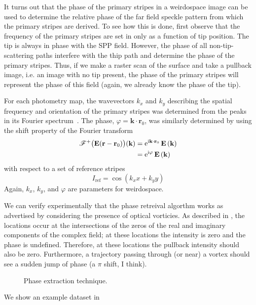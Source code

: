 It turns out that the phase of the primary stripes in a weirdospace image
can be used to determine the relative phase of the far field speckle
pattern from which the primary stripes are derived.  To see how this is
done, first observe that the frequency of the primary stripes are set in
 only as a function of tip position.  The tip
is always in phase with the SPP field.  However, the phase of all
non-tip-scattering paths interfere with the thip path and determine the
phase of the primary stripes.  Thus, if we make a raster scan of the
surface and take a pullback image, i.e. an image with no tip present, the
phase of the primary stripes will represent the phase of this field (again,
we already know the phase of the tip).

For each photometry map, the wavevectors $k_x$ and $k_y$ describing the
spatial frequency and orientation of the primary stripes was determined
from the peaks in its Fourier spectrum~\cite{huntley1986speckle}.  The
phase, $\varphi=\mathbf{k}\cdot\mathbf{r}_0$, was similarly determined
by using the shift property of the Fourier transform
\begin{align}
{\mathscr{F}^{+}\bigl(\mathbf{E}(\mathbf{r}-\mathbf{r}_0)\bigr)}(\mathbf{k}) &= 
{\mathrm{e}}^{{\mathrm{i}} \mathbf{k}\cdot \mathbf{r}_0}\,
\mathbf{E}\left(\mathbf{k}\right)\\
&= {\mathrm{e}}^{{\mathrm{i}} \varphi}\, \mathbf{E}\left(\mathbf{k}\right)
\end{align}
with respect to a set of reference stripes
\begin{equation}
I_\mathrm{ref} = \cos(k_x x + k_y y)
\end{equation}
Again, $k_x$, $k_y$, and $\varphi$ are parameters for weirdospace.

We can verify experimentally that the phase retreival algorthm works as
advertised by considering the presence of optical vorticies.  As described
in , the locations occur at the intersections of the zeros
of the real and imaginary components of the complex field; at these
locations the intensity is zero and the phase is undefined.  Therefore, at
these locations the pullback intensity should also be zero.  Furthermore, a
trajectory passing through (or near) a vortex should see a sudden jump of
phase (a $\pi$ shift, I think).

\begin{figure}
\centering
\caption{Phase extraction technique.}
\label{fig:phaseextractiontechnique}
\end{figure}

We show an example dataset in 
